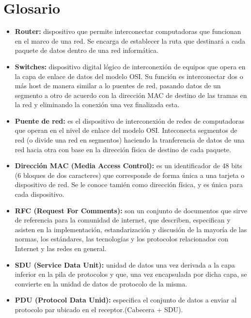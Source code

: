 \documentclass[a4paper,11pt]{article}
\begin{document}
\section{Glosario}
\begin{itemize}
\item \textbf{Router:} dispositivo que permite interconectar computadoras que funcionan en el marco de una red. Se encarga de establecer la ruta que destinará a cada paquete de datos dentro de una red informática.

\item \textbf{Switches:}  dispositivo digital lógico de interconexión de equipos que opera en la capa de enlace de datos del modelo OSI. Su función es interconectar dos o más host de manera similar a lo puentes de red, pasando datos de un segmento a otro de acuerdo con la dirección MAC de destino de las tramas en la red y eliminando la conexión una vez finalizada esta.

\item \textbf{Puente de red:} es el dispositivo de interconexión de redes de computadoras que operan en el nivel de enlace del modelo OSI. Inteconecta segmentos de red (o divide una red en segmentos) haciendo la tranferencia de datos de una red hacia otra con base en la dirección física de destino de cada paquete.

\item \textbf{Dirección MAC (Media Access Control):} es un identificador de 48 bits (6 bloques de dos caracteres) que corresponde de forma única a una tarjeta o dispositivo de red. Se le conoce tamién como dirección física, y es única para cada dispositivo. 

\item \textbf{RFC (Request For Comments):} son un conjunto de documentos que sirve de referencia para la comunidad de internet, que describen, especifican y asisten en la implementación, estandarización y discusión de la mayoría de las normas, los estándares, las tecnologías y los protocolos relacionados con Internet y las redes en general. 

\item \textbf{SDU (Service Data Unit):} unidad de datos una vez derivada a la capa inferior en la pila de protocolos y que, una vez encapsulada por dicha capa, se convierte en la unidad de datos de protocolo de la misma.

\item \textbf{PDU (Protocol Data Unid):} especifica el conjunto de datos a enviar al protocolo par ubicado en el receptor.(Cabecera + SDU).


\end{itemize}
\end{document}
